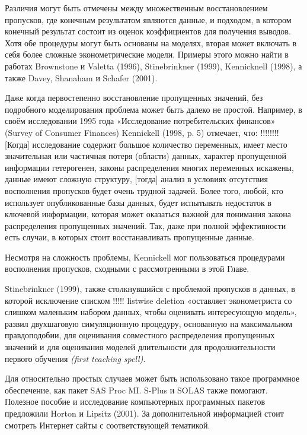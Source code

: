 Различия могут быть отмечены между множественным восстановлением пропусков, где конечным результатом являются данные, и подходом, в котором конечный результат состоит из оценок коэффициентов для получения выводов. Хотя обе процедуры могут быть основаны на моделях, вторая может включать в себя более сложные эконометрические модели. Примеры этого можно найти в работах Brownstone и Valetta (1996), Stinebrinkner (1999), Kennicknell (1998), а также Davey, Shanaham и Schafer (2001).

Даже когда первостепенно восстановление пропущенных значений, без подробного моделирования проблема может быть далеко не простой. Например, в своём исследовании 1995 года «Исследование потребительских финансов» (Survey of Consumer Finances) Kennickell (1998, p. 5) отмечает, что:
!!!!!!!!
[Когда] исследование содержит большое количество переменных, имеет место значительная или частичная потеря (области) данных, характер пропущенной информации гетерогенен, законы распределения многих переменных искажены, данные имеют сложную структуру, [тогда] анализ в условиях отсутствия восполнения пропусков будет очень трудной задачей. Более того, любой, кто использует опубликованные базы данных, будет испытывать недостаток в ключевой информации, которая может оказаться важной для понимания закона распределения пропущенных значений. Так, даже при полной эффективности есть случаи, в которых стоит восстанавливать пропущенные данные.

Несмотря на сложность проблемы, Kennickell мог пользоваться процедурами восполнения пропусков, сходными с рассмотренными в этой Главе.

Stinebrinkner (1999), также столкнувшийся с проблемой пропусков в данных, в которой исключение списком !!!!! listwise deletion «оставляет эконометриста со слишком маленьким набором данных, чтобы оценивать интересующую модель», развил двухшаговую симуляционную процедуру, основанную на максимальном правдоподобии, для оценивания совместного распределения пропущенных значений и для оценивания моделей длительности для продолжительности первого обучения \emph{(first teaching spell)}.

Для относительно простых случаев может быть использовано такое программное обеспечение, как пакет SAS Proc MI. S-Plus и SOLAS также помогают. Полезное пособие и исследование компьютерных программных пакетов предложили Horton и Lipsitz (2001). За дополнительной информацией стоит смотреть Интернет сайты с соответствующей тематикой.

